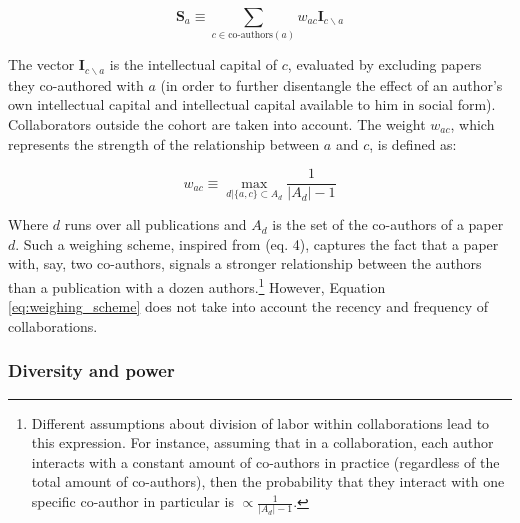 \documentclass{article}
\begin{document}
\begin{equation}
    \bm{S}_{a} \equiv \sum_{c \in \text{co-authors}(a)} w_{ac} \bm{I}_{c\backslash a}
\end{equation}

The vector $\bm{I}_{c\backslash a}$ is the intellectual capital of $c$, evaluated by excluding papers they co-authored with $a$ (in order to further disentangle the effect of an author's own intellectual capital and intellectual capital available to him in social form). Collaborators outside the cohort are taken into account. The weight $w_{ac}$, which represents the strength of the relationship between $a$ and $c$, is defined as:

\begin{equation}
    w_{ac} \equiv \max_{d|\{a,c\} \subset A_d} \frac{1}{|A_d|-1}
    \label{eq:weighing_scheme}
\end{equation}

Where $d$ runs over all publications and $A_d$ is the set of the co-authors of a paper $d$. Such a weighing scheme, inspired from \citealt{Newman2004} (eq. 4), captures the fact that a paper with, say, two co-authors, signals a stronger relationship between the authors than a publication with a dozen authors.\footnote{Different assumptions about division of labor within collaborations lead to this expression. For instance, assuming that in a collaboration, each author interacts with a constant amount of co-authors in practice (regardless of the total amount of co-authors), then the probability that they interact with one specific co-author in particular is $\propto \frac{1}{|A_d|-1}$. 
} However, Equation \eqref{eq:weighing_scheme} does not take into account the recency and frequency of collaborations.

\subsubsection{Diversity and power}
\end{document}
